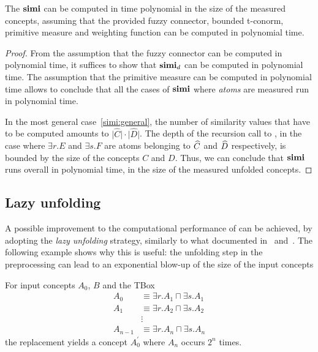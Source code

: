   \begin{proposition}
    The \csm \(\mathbf{simi}\) can be computed in time polynomial in the size of the measured concepts, assuming that the provided fuzzy connector, bounded t-conorm, primitive measure and weighting function can be computed in polynomial time. 
  \end{proposition}
  \begin{proof}
    From the assumption that the fuzzy connector can be computed in polynomial time, it suffices to show that \(\mathbf{simi}_d\) can be computed in polynomial time.
    The assumption that the primitive measure can be computed in polynomial time allows to conclude that all the cases of \(\mathbf{simi}\) where \emph{atoms} are measured run in polynomial time.

    In the most general case~\eqref{simi:general}, the number of similarity values that have to be computed amounts to \(\lvert \widehat{C} \rvert \cdot \lvert \widehat{D} \rvert\).
    The depth of the recursion call to \simi, in the case where \(\exists{}r.E\) and \(\exists{}s.F\) are atoms belonging to \(\widehat{C}\) and \(\widehat{D}\) respectively, is bounded by the size of the concepts \(C\) and \(D\).
    Thus, we can conclude that \(\mathbf{simi}\) runs overall in polynomial time, in the size of the measured unfolded concepts.
  \end{proof}

  \subsection{Lazy unfolding}

  A possible improvement to the computational performance of \simi can be achieved, by adopting the \emph{lazy unfolding} strategy, similarly to what documented in~\cite{lazydog} and~\cite{DLbook}.
  The following example shows why this is useful: the unfolding step in the preprocessing can lead to an exponential blow-up of the size of the input concepts
  \begin{example}
    \label{exa:dog}
    For input concepts \(A_0\), \(B\) and the TBox
    \begin{align*}
      A_0 &\equiv \exists{}r.A_1 \sqcap \exists{}s.A_1 \\
      A_1 &\equiv \exists{}r.A_2 \sqcap \exists{}s.A_2 \\
      &\vdots\\
      A_{n-1} &\equiv \exists{}r.A_n \sqcap \exists{}s.A_n
    \end{align*}
    the replacement yields a concept \(A_0^\prime\) where \(A_n\) occurs \(2^n\) times.
  \end{example}
  

